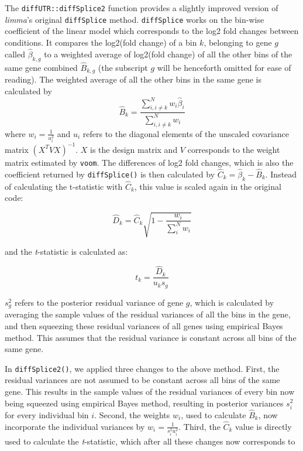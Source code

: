 \documentclass{bmcart}
\begin{document}
The \texttt{diffUTR::diffSplice2} function provides a slightly improved version of \textit{limma}'s original \texttt{diffSplice} method. \texttt{diffSplice} works on the bin-wise coefficient of the linear model which corresponds to the log2 fold changes between conditions. It compares the log2(fold change) of a bin $k$, belonging to gene $g$ called $\hat{\beta}_{k,g}$ to a weighted average of log2(fold change) of all the other bins of the same gene combined $\hat{B}_{k,g}$ (the subscript $g$ will be henceforth omitted for ease of reading). The weighted average of all the other bins in the same gene is calculated by
\begin{equation}
    \hat{B}_{k}= \frac{\sum_{i, i\neq k}^{N}{w_{i} \hat{\beta}_{i}}}{\sum_{i, i\neq k}^{N}w_{i}}
\end{equation}
where $w_{i}=\frac{1}{u_{i}^2}$ and $u_{i}$ refers to the diagonal elements of the unscaled covariance matrix $(X^TVX)^{-1}$. $X$ is the design matrix and $V$ corresponds to the weight matrix estimated by \texttt{voom}. The differences of log2 fold changes, which is also the coefficient returned by \texttt{diffSplice()} is then calculated by $\hat{C}_{k} = \hat{\beta}_{k} - \hat{B}_{k}$. Instead of calculating the t-statistic with $\hat{C}_{k}$, this value is scaled again in the original code:

\begin{equation}
    \hat{D}_{k} =\hat{C}_{k}\sqrt{1-\frac{{w}_{i}}{\sum_{i}^{N}w_{i}}}
\end{equation}

and the \textit{t}-statistic is calculated as:

\begin{equation}
    t_{k} =\frac{\hat{D}_{k}}{u_{k}s_{g}}
\end{equation}

$s_{g}^2$ refers to the posterior residual variance of gene $g$, which is calculated by averaging the sample values of the residual variances of all the bins in the gene, and then squeezing these residual variances of all genes using empirical Bayes method. This assumes that the residual variance is constant across all bins of the same gene. 

In \texttt{diffSplice2()}, we applied three changes to the above method. First, the residual variances are not assumed to be constant across all bins of the same gene. This results in the sample values of the residual variances of every bin now being squeezed using empirical Bayes method, resulting in posterior variances $s_{i}^2$ for every individual bin $i$. Second, the weights $w_{i}$, used to calculate $\hat{B}_{k}$, now incorporate the individual variances by $w_{i}=\frac{1}{s_{i}^2u_{i}^2}$. Third, the $\hat{C}_{k}$ value is directly used to calculate the \textit{t}-statistic, which after all these changes now corresponds to
\end{document}
